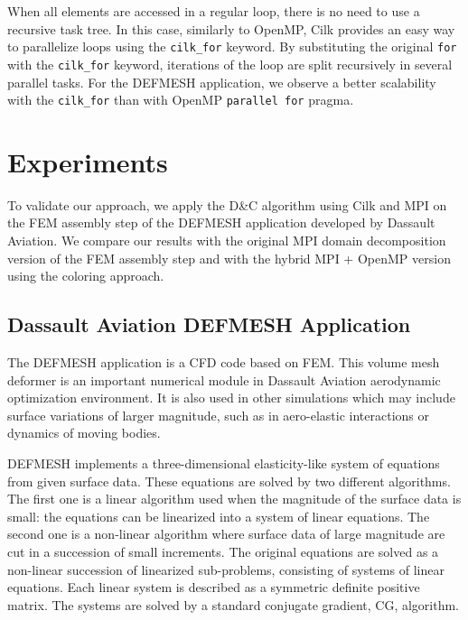 \documentclass[10pt]{IOS-Book-Article}
\begin{document}
When all elements are accessed in a regular loop, there is no need to use a recursive task tree.
In this case, similarly to OpenMP, Cilk provides an easy way to parallelize loops using the { \tt cilk\_for} keyword.
By substituting the original {\tt for} with the {\tt cilk\_for} keyword, iterations of the loop are split recursively in several parallel tasks.
For the DEFMESH application, we observe a better scalability with the {\tt cilk\_for} than with OpenMP {\tt parallel for} pragma.


\section{Experiments}
\label{sec:exp}
To validate our approach, we apply the D\&C algorithm using Cilk and MPI on the FEM assembly step of the DEFMESH application developed by Dassault Aviation.
We compare our results with the original MPI domain decomposition version of the FEM assembly step and with the hybrid MPI + OpenMP version using the coloring approach.

\subsection{Dassault Aviation DEFMESH Application}
The DEFMESH application is a CFD code based on FEM.
This volume mesh deformer is an important numerical module in Dassault Aviation aerodynamic optimization environment.
It is also used in other simulations which may include surface variations of larger magnitude, such as in aero-elastic interactions or dynamics of moving bodies.

DEFMESH implements a three-dimensional elasticity-like system of equations from given surface data.
These equations are solved by two different algorithms.
The first one is a linear algorithm used when the magnitude of the surface data is small: the equations can be linearized into a system of linear equations.
The second one is a non-linear algorithm where surface data of large magnitude are cut in a succession of small increments.
The original equations are solved as a non-linear succession of linearized sub-problems, consisting of systems of linear equations.
Each linear system is described as a symmetric definite positive matrix.
The systems are solved by a standard conjugate gradient, CG, algorithm.
\end{document}
